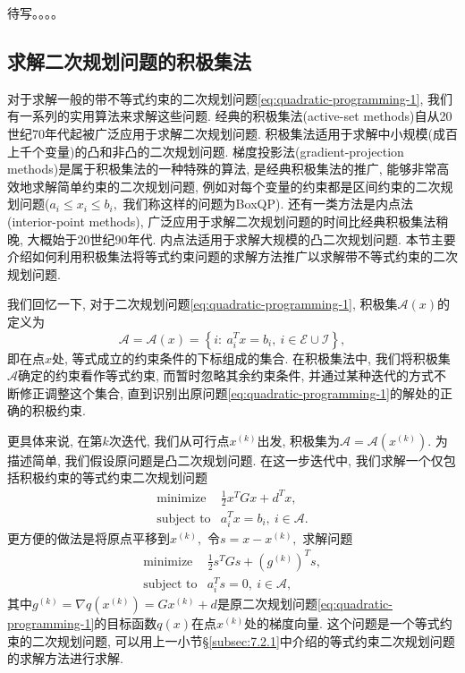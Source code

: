 \documentclass{SBCbookchapter}
\numberwithin{equation}{section}
\begin{document}
待写。。。。


\subsection{求解二次规划问题的积极集法}
\label{subsec:7.2.2}

对于求解一般的带不等式约束的二次规划问题\eqref{eq:quadratic-programming-1}, 我们有一系列的实用算法来求解这些问题. 经典的积极集法(active-set methods)自从20世纪70年代起被广泛应用于求解二次规划问题. 积极集法适用于求解中小规模(成百上千个变量)的凸和非凸的二次规划问题. 梯度投影法(gradient-projection methods)是属于积极集法的一种特殊的算法, 是经典积极集法的推广, 能够非常高效地求解简单约束的二次规划问题, 例如对每个变量的约束都是区间约束的二次规划问题($a_i \leqslant x_i \leqslant b_i,$ 我们称这样的问题为BoxQP). 还有一类方法是内点法(interior-point methods), 广泛应用于求解二次规划问题的时间比经典积极集法稍晚, 大概始于20世纪90年代. 内点法适用于求解大规模的凸二次规划问题. 本节主要介绍如何利用积极集法将等式约束问题的求解方法推广以求解带不等式约束的二次规划问题.

我们回忆一下, 对于二次规划问题\eqref{eq:quadratic-programming-1}, 积极集$\mathcal{A}(x)$的定义为
\begin{equation}
\label{eq:qp-active-set}
\mathcal{A} = \mathcal{A}(x) = \left\{ i : ~ a_i^T x = b_i, ~ i \in \mathcal{E} \cup \mathcal{I} \right\},
\end{equation}
即在点$x$处, 等式成立的约束条件的下标组成的集合. 在积极集法中, 我们将积极集$\mathcal{A}$确定的约束看作等式约束, 而暂时忽略其余约束条件, 并通过某种迭代的方式不断修正调整这个集合, 直到识别出原问题\eqref{eq:quadratic-programming-1}的解处的正确的积极约束.

更具体来说, 在第$k$次迭代, 我们从可行点$x^{(k)}$出发, 积极集为$\mathcal{A} = \mathcal{A}(x^{(k)}).$ 为描述简单, 我们假设原问题是凸二次规划问题. 在这一步迭代中, 我们求解一个仅包括积极约束的等式约束二次规划问题
\begin{equation}
\label{eq:qp-active-set-1}
\begin{array}{cl}
\text{minimize} & \frac{1}{2} x^T G x + d^T x, \\
\text{subject to} & a_i^T x = b_i, ~ i \in \mathcal{A}.
\end{array}
\end{equation}
更方便的做法是将原点平移到$x^{(k)},$ 令$s = x - x^{(k)},$ 求解问题
\begin{equation}
\label{eq:qp-active-set-2}
\begin{array}{cl}
\text{minimize} & \frac{1}{2} s^T G s + (g^{(k)})^T s, \\
\text{subject to} & a_i^T s = 0, ~ i \in \mathcal{A},
\end{array}
\end{equation}
其中$g^{(k)} = \nabla q(x^{(k)}) = G x^{(k)} + d$是原二次规划问题\eqref{eq:quadratic-programming-1}的目标函数$q(x)$在点$x^{(k)}$处的梯度向量. 这个问题是一个等式约束的二次规划问题, 可以用上一小节\S\ref{subsec:7.2.1}中介绍的等式约束二次规划问题的求解方法进行求解.
\end{document}
